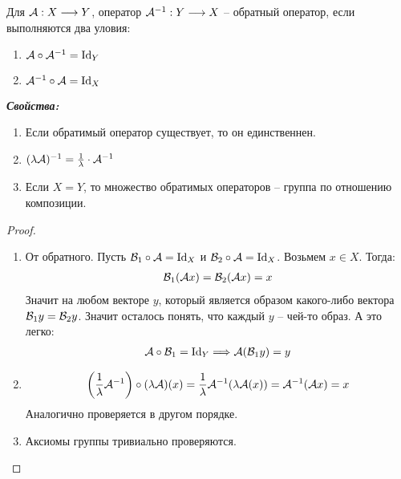 \begin{conj}
    Для $\mathcal{A} : X \longrightarrow Y$, оператор $\mathcal{A}^{-1} : Y \longrightarrow X$ -- обратный оператор, если выполняются два уловия:
    \begin{enumerate}
        \item $\mathcal{A} \circ \mathcal{A}^{-1} = \operatorname{Id}_{Y}$
        \item $\mathcal{A}^{-1} \circ \mathcal{A} = \operatorname{Id}_{X}$
    \end{enumerate}
\end{conj}
\textit{\textbf{Свойства: }}
\begin{enumerate}
    \item Если обратимый оператор существует, то он единственнен. 
    \item $(\lambda \mathcal{A})^{-1} = \frac{1}{\lambda} \cdot \mathcal{A}^{-1}$
    \item Если $X = Y$, то множество обратимых операторов -- группа по отношению композиции. 
\end{enumerate}
\begin{proof} \quad

    \begin{enumerate}
        \item От обратного. Пусть $\mathcal{B}_1 \circ \mathcal{A} = \operatorname{Id}_X$ и $\mathcal{B}_2 \circ \mathcal{A} = \operatorname{Id}_X$. Возьмем $x \in X$. Тогда:
        \begin{gather*}
            \mathcal{B}_1(\mathcal{A} x) = \mathcal{B}_2(\mathcal{A} x) = x
        \end{gather*}
        Значит на любом векторе $y$, который является образом какого-либо вектора $\mathcal{B}_1 y = \mathcal{B}_2 y$. Значит осталось понять, что каждый $y$ -- чей-то образ. А это легко:
        \begin{gather*}
            \mathcal{A} \circ \mathcal{B}_1 = \operatorname{Id}_Y \Longrightarrow \mathcal{A}(\mathcal{B}_1 y) = y
        \end{gather*}
        \item \begin{gather*}
            \left( \frac{1}{\lambda} \mathcal{A}^{-1}\right) \circ (\lambda \mathcal{A})(x) = \frac{1}{\lambda} \mathcal{A}^{-1} (\lambda \mathcal{A}(x)) = \mathcal{A}^{-1} (\mathcal{A} x) = x
        \end{gather*}
        Аналогично проверяется в другом порядке. 
        \item Аксиомы группы тривиально проверяются. 
    \end{enumerate}
\end{proof}

\vspace*{5mm}


